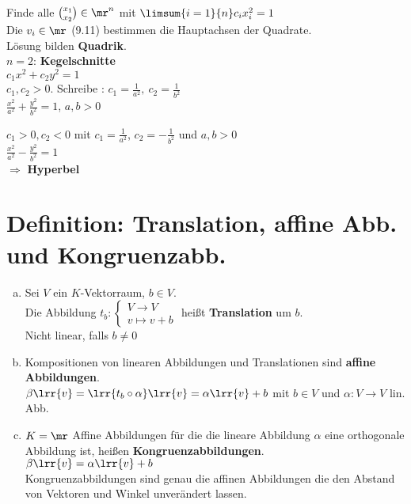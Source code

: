 	Finde alle $ \binom{x_1} {x_2}\in\mr^n $ mit $ \limsum{i=1}{n}c_ix_i^2=1 $\\
	Die $ v_i\in\mr $ (9.11) bestimmen die Hauptachsen der Quadrate.\\
	Lösung bilden \textbf{Quadrik}.\\
	$ n=2 $: \textbf{Kegelschnitte}\\
	$ c_1x^2+c_2y^2=1 $\\
	$c_1,c_2>0$. Schreibe : $ c_1=\frac{1}{a^2},\ c_2=\frac{1}{b^2} $\\
	$ \frac{x^2}{a^2}+\frac{y^2}{b^2}=1 $, $ a,b>0 $

	$c_1>0, c_2<0$ mit $c_1=\frac{1}{a^2}$, $c_2=-\frac{1}{b^2}$ und $a,b>0$\\
	$\frac{x^2}{a^2}-\frac{y^2}{b^2}=1$\\
	$\Rightarrow$ \textbf{Hyperbel}

\section{Definition: Translation, affine Abb. und Kongruenzabb.}
	\begin{enumerate}[a)]
		\item Sei $V$ ein $K$-Vektorraum, $b\in V$.\\
			Die Abbildung $t_b:\begin{cases}V\rightarrow V\\v\mapsto v+b\end{cases}$ heißt \textbf{Translation} um $b$.\\
			Nicht linear, falls $b\neq 0$
		\item Kompositionen von linearen Abbildungen und Translationen sind \textbf{affine Abbildungen}.\\
			$\beta\lrr{v}=\lrr{t_b\circ\alpha}\lrr{v}=\alpha\lrr{v}+b$ mit $b\in V$ und $\alpha:V\rightarrow V$ lin. Abb.
		\item $K=\mr$ Affine Abbildungen für die die lineare Abbildung $\alpha$ eine orthogonale Abbildung ist, heißen \textbf{Kongruenzabbildungen}.\\
			$\beta\lrr{v}=\alpha\lrr{v}+b$\\
			Kongruenzabbildungen sind genau die affinen Abbildungen die den Abstand von Vektoren und Winkel unverändert lassen.
	\end{enumerate}
	
